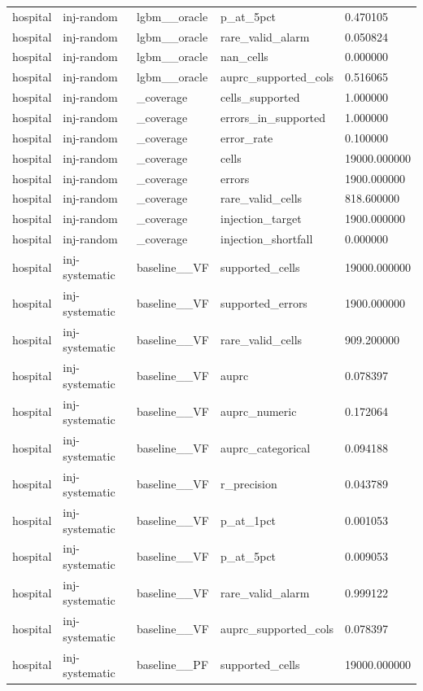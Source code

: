 \begin{tabular}{lllll}
hospital & inj-random & lgbm\_\_oracle & p\_at\_5pct & 0.470105 \\
hospital & inj-random & lgbm\_\_oracle & rare\_valid\_alarm & 0.050824 \\
hospital & inj-random & lgbm\_\_oracle & nan\_cells & 0.000000 \\
hospital & inj-random & lgbm\_\_oracle & auprc\_supported\_cols & 0.516065 \\
hospital & inj-random & \_coverage & cells\_supported & 1.000000 \\
hospital & inj-random & \_coverage & errors\_in\_supported & 1.000000 \\
hospital & inj-random & \_coverage & error\_rate & 0.100000 \\
hospital & inj-random & \_coverage & cells & 19000.000000 \\
hospital & inj-random & \_coverage & errors & 1900.000000 \\
hospital & inj-random & \_coverage & rare\_valid\_cells & 818.600000 \\
hospital & inj-random & \_coverage & injection\_target & 1900.000000 \\
hospital & inj-random & \_coverage & injection\_shortfall & 0.000000 \\
hospital & inj-systematic & baseline\_\_VF & supported\_cells & 19000.000000 \\
hospital & inj-systematic & baseline\_\_VF & supported\_errors & 1900.000000 \\
hospital & inj-systematic & baseline\_\_VF & rare\_valid\_cells & 909.200000 \\
hospital & inj-systematic & baseline\_\_VF & auprc & 0.078397 \\
hospital & inj-systematic & baseline\_\_VF & auprc\_numeric & 0.172064 \\
hospital & inj-systematic & baseline\_\_VF & auprc\_categorical & 0.094188 \\
hospital & inj-systematic & baseline\_\_VF & r\_precision & 0.043789 \\
hospital & inj-systematic & baseline\_\_VF & p\_at\_1pct & 0.001053 \\
hospital & inj-systematic & baseline\_\_VF & p\_at\_5pct & 0.009053 \\
hospital & inj-systematic & baseline\_\_VF & rare\_valid\_alarm & 0.999122 \\
hospital & inj-systematic & baseline\_\_VF & auprc\_supported\_cols & 0.078397 \\
hospital & inj-systematic & baseline\_\_PF & supported\_cells & 19000.000000 \\

\end{tabular}
